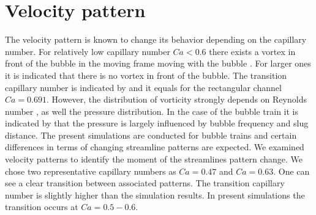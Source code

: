 \documentclass{article}
\begin{document}
\section{Velocity pattern}
\label{sec:velocity}
The velocity pattern is known to change its behavior depending on the capillary number. For
relatively low capillary number $Ca<0.6$ there exists a vortex in front of the bubble in the moving
frame moving with the bubble \cite{heil-threedim}. For larger ones it is indicated that there is no
vortex in front of the bubble. The transition capillary number is indicated by
\citet{heil-threedim} and it equals for the rectangular channel $Ca=0.691$. However, the
distribution of vorticity strongly depends on Reynolds number \cite{heil-bretherton}, as well the
pressure distribution. In the case of the bubble train it is indicated by \citet{kreutzer-taylor}
that the pressure is largely influenced by bubble frequency and slug distance. The present
simulations are conducted for bubble trains and certain differences in terms of changing streamline
patterns are expected. We examined velocity patterns to identify the moment of the streamlines
pattern change. We chose two
representative capillary numbers as $Ca=0.47$ and $Ca=0.63$. 
One can
see a clear transition between associated patterns. The transition capillary number
\cite{heil-threedim} is slightly higher than the simulation results. In present simulations the
transition occurs at $Ca=0.5-0.6$.
\end{document}
